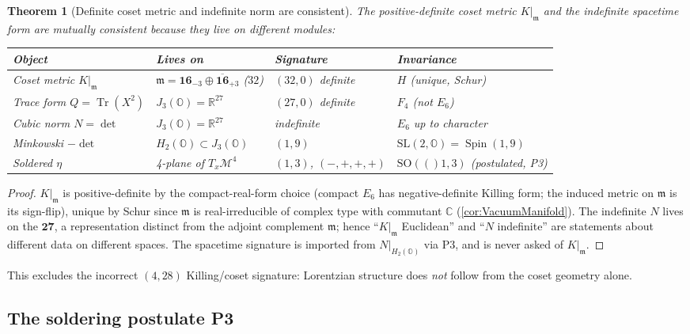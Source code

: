 \documentclass[11pt]{article}
\renewcommand{\arraystretch}{1.18}
\theoremstyle{plain}
\newtheorem{theorem}{Theorem}[section]
\theoremstyle{definition}
\theoremstyle{remark}
\newcommand{\SO}[1]{\mathrm{SO}(#1)}
\newcommand{\SL}{\mathrm{SL}}
\newcommand{\Spin}{\operatorname{Spin}}
\newcommand{\Tr}{\operatorname{Tr}}
\begin{document}
\begin{theorem}[Definite coset metric and indefinite norm are consistent]
\label{thm:spacetime:consistent}
The positive-definite coset metric $K|_{\mathfrak m}$ and the indefinite spacetime
form are mutually consistent because they live on different modules:
\begin{center}\renewcommand{\arraystretch}{1.25}
\begin{tabular}{@{}llll@{}}
\toprule
Object & Lives on & Signature & Invariance \\
\midrule
Coset metric $K|_{\mathfrak m}$ & $\mathfrak m=\mathbf{16}_{-3}\oplus\overline{\mathbf{16}}_{+3}$ ($32$) & $(32,0)$ definite & $H$ (unique, Schur)\\
Trace form $Q=\Tr(X^2)$ & $J_3(\mathbb O)=\mathbb R^{27}$ & $(27,0)$ definite & $F_4$ (\emph{not} $E_6$)\\
Cubic norm $N=\det$ & $J_3(\mathbb O)=\mathbb R^{27}$ & indefinite & $E_6$ up to character\\
Minkowski $-\det$ & $H_2(\mathbb O)\subset J_3(\mathbb O)$ & $(1,9)$ & $\SL(2,\mathbb O)=\Spin(1,9)$\\
Soldered $\eta$ & 4-plane of $T_x\mathcal M^4$ & $(1,3)$, $(-,+,+,+)$ & $\SO(1,3)$ (postulated, P3)\\
\bottomrule
\end{tabular}
\end{center}
\end{theorem}
\begin{proof}
$K|_{\mathfrak m}$ is positive-definite by the compact-real-form choice (compact $E_6$
has negative-definite Killing form; the induced metric on $\mathfrak m$ is its
sign-flip), unique by Schur since $\mathfrak m$ is real-irreducible of complex type with
commutant $\mathbb C$ (\autoref{cor:VacuumManifold}). The indefinite $N$ lives on the
$\mathbf{27}$, a representation distinct from the adjoint complement $\mathfrak m$;
hence ``$K|_{\mathfrak m}$ Euclidean'' and ``$N$ indefinite'' are statements about
different data on different spaces. The spacetime signature is imported from
$N|_{H_2(\mathbb O)}$ via P3, and is never asked of $K|_{\mathfrak m}$.
\end{proof}

This excludes the incorrect $(4,28)$ Killing/coset signature: Lorentzian structure does
\emph{not} follow from the coset geometry alone.

\subsection{The soldering postulate P3}
\label{sec:spacetime:P3}
\end{document}
